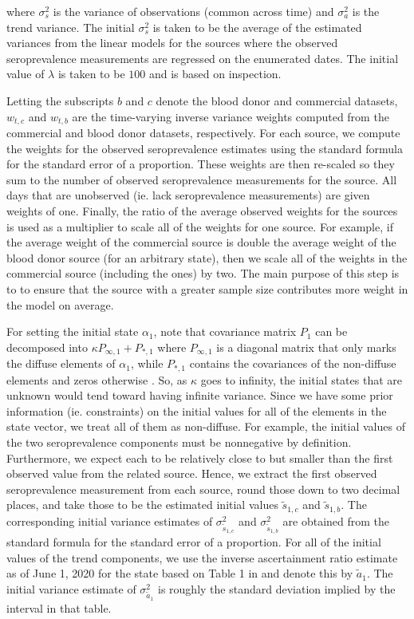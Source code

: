 \documentclass{article}
\begin{document}
where $\sigma^2_s$ is the variance of observations (common across time) and $\sigma^2_a$ is the trend variance. The initial $\sigma^2_s$ is taken to be the average of the estimated variances from the linear models for the sources where the observed seroprevalence measurements are regressed on the enumerated dates. The initial value of $\lambda$ is taken to be $100$ and is based on inspection. 

Letting the subscripts $b$ and $c$ denote the blood donor and commercial datasets, $w_{t,c}$ and $w_{t,b}$ are the time-varying inverse variance weights computed from the commercial and blood donor datasets, respectively. For each source, we compute the weights for the observed seroprevalence estimates using the standard formula for the standard error of a proportion. These weights are then re-scaled so they sum to the number of observed seroprevalence measurements for the source. All days that are unobserved (ie. lack seroprevalence measurements) are given weights of one. Finally, the ratio of the average observed weights for the sources is used as a multiplier to scale all of the weights for one source. For example, if the average weight of the commercial source is double the average weight of the blood donor source (for an arbitrary state), then we scale all of the weights in the commercial source (including the ones) by two. The main purpose of this step is to to ensure that the source with a greater sample size contributes more weight in the model on average. %

For setting the initial state $\alpha_1$, note that covariance matrix $P_1$ can be decomposed into $\kappa P_{\infty, 1} + P_{*, 1}$ where $P_{\infty, 1}$ is a diagonal matrix that only marks the diffuse elements of $\alpha_1$, while $P_{*, 1}$ contains the covariances of the non-diffuse elements and zeros otherwise \citep{koopman2003filtering}. So, as $\kappa$ goes to infinity, the initial states that are unknown would tend toward having infinite variance. Since we have some prior information (ie. constraints) on the initial values for all of the elements in the state vector, we treat all of them as non-diffuse. For example, the initial values of the two seroprevalence components must be nonnegative by definition. Furthermore, we expect each to be relatively close to but smaller than the first observed value from the related source. Hence, we extract the first observed seroprevalence measurement from each source, round those down to two decimal places, and take those to be the estimated initial values $\tilde{s}_{1,c}$ and
$\tilde{s}_{1,b}$. The corresponding initial variance estimates of $\sigma^2_{\tilde{s}_{1,c}}$ and $\sigma^2_{\tilde{s}_{1,b}}$ are obtained from the standard formula for the standard error of a proportion. For all of the initial values of the trend components, we use the inverse ascertainment ratio estimate as of June 1, 2020 for the state based on Table 1 in \citet{unwin2020state} and denote this by $\tilde{a}_1$. The initial variance estimate of $\sigma^2_{\tilde{a}_1}$ is roughly the standard deviation implied by the interval in that table.  %
\end{document}

